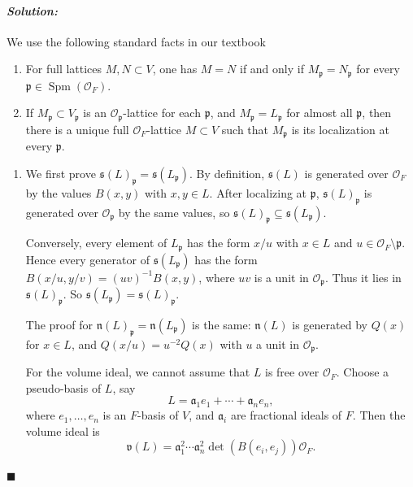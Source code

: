 \documentclass[12pt, a4paper]{article}
\newenvironment{solution}
  {\paragraph{\textit{Solution:}}\par\medskip}
  {\hfill$\blacksquare$\vspace{0.1cm}}
\begin{document}
\begin{solution}
We use the following standard facts in our textbook

\begin{enumerate}
    \item[(a)] For full lattices \(M,N\subset V\), one has \(M=N\) if and only if
    \(M_{\mathfrak p}=N_{\mathfrak p}\) for every \(\mathfrak p\in \operatorname{Spm}(\mathcal O_F)\).
    \item[(b)] If \(M_{\mathfrak p}\subset V_{\mathfrak p}\) is an \(\mathcal O_{\mathfrak p}\)-lattice for each
    \(\mathfrak p\), and \(M_{\mathfrak p}=L_{\mathfrak p}\) for almost all \(\mathfrak p\), then there is a unique
    full \(\mathcal O_F\)-lattice \(M\subset V\) such that \(M_{\mathfrak p}\) is its localization at every
    \(\mathfrak p\).
\end{enumerate}

\begin{enumerate}
    \item We first prove \( \mathfrak s(L)_{\mathfrak p}=\mathfrak s(L_{\mathfrak p}) \).
    By definition, \(\mathfrak s(L)\) is generated over \(\mathcal O_F\) by the values
    \(B(x,y)\) with \(x,y\in L\). After localizing at \(\mathfrak p\), \(\mathfrak s(L)_{\mathfrak p}\)
    is generated over \(\mathcal O_{\mathfrak p}\) by the same values, so
    \(\mathfrak s(L)_{\mathfrak p}\subseteq \mathfrak s(L_{\mathfrak p})\).

    Conversely, every element of \(L_{\mathfrak p}\) has the form \(x/u\) with
    \(x\in L\) and \(u\in \mathcal O_F\setminus \mathfrak p\). Hence every generator of
    \(\mathfrak s(L_{\mathfrak p})\) has the form
    \(B(x/u,y/v)=(uv)^{-1}B(x,y)\), where \(uv\) is a unit in \(\mathcal O_{\mathfrak p}\).
    Thus it lies in \(\mathfrak s(L)_{\mathfrak p}\). So
    \(\mathfrak s(L_{\mathfrak p})=\mathfrak s(L)_{\mathfrak p}\).

    The proof for \( \mathfrak n(L)_{\mathfrak p}=\mathfrak n(L_{\mathfrak p}) \) is the same:
    \(\mathfrak n(L)\) is generated by \(Q(x)\) for \(x\in L\), and
    \(Q(x/u)=u^{-2}Q(x)\) with \(u\) a unit in \(\mathcal O_{\mathfrak p}\).

    For the volume ideal, we cannot assume that \(L\) is free over
\(\mathcal O_F\). Choose a pseudo-basis of \(L\), say
\[
L=\mathfrak a_1 e_1+\cdots+\mathfrak a_n e_n,
\]
where \(e_1,\dots,e_n\) is an \(F\)-basis of \(V\), and
\(\mathfrak a_i\) are fractional ideals of \(F\). Then the volume ideal is
\[
\mathfrak v(L)
=
\mathfrak a_1^2\cdots \mathfrak a_n^2
\det(B(e_i,e_j))\mathcal O_F .
\]


\end{enumerate}
\end{solution}
\end{document}
